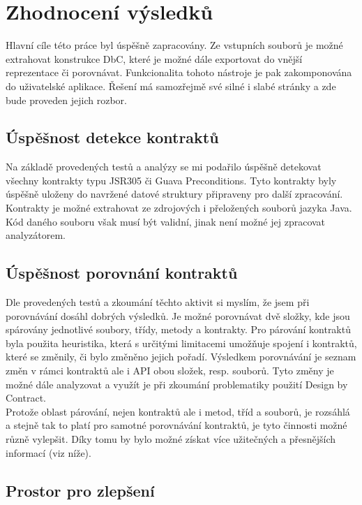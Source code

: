 \chapter{Zhodnocení výsledků}
	Hlavní cíle této práce byl úspěšně zapracovány. Ze vstupních souborů je možné extrahovat konstrukce DbC, které je možné dále exportovat do vnější reprezentace či porovnávat. Funkcionalita tohoto nástroje je pak zakomponována do uživatelské aplikace. Řešení má samozřejmě své silné i slabé stránky a zde bude proveden jejich rozbor.	
	
	
	\section{Úspěšnost detekce kontraktů}
		Na základě provedených testů a analýzy se mi podařilo úspěšně detekovat všechny kontrakty typu JSR305 či Guava Preconditions. Tyto kontrakty byly úspěšně uloženy do navržené datové struktury připraveny pro další zpracování. Kontrakty je možné extrahovat ze zdrojových i přeložených souborů jazyka Java. Kód daného souboru však musí být validní, jinak není možné jej zpracovat analyzátorem.
	
	\section{Úspěšnost porovnání kontraktů}
		Dle provedených testů a zkoumání těchto aktivit si myslím, že jsem při porovnávání dosáhl dobrých výsledků. Je možné porovnávat dvě složky, kde jsou spárovány jednotlivé soubory, třídy, metody a kontrakty. Pro párování kontraktů byla použita heuristika, která s určitými limitacemi umožňuje spojení i kontraktů, které se změnily, či bylo změněno jejich pořadí. Výsledkem porovnávání je seznam změn v rámci kontraktů ale i API obou složek, resp. souborů. Tyto změny je možné dále analyzovat a využít je při zkoumání problematiky použití Design by Contract.\\
		
		Protože oblast párování, nejen kontraktů ale i metod, tříd a souborů, je rozsáhlá a stejně tak to platí pro samotné porovnávání kontraktů, je tyto činnosti možné různě vylepšit. Díky tomu by bylo možné získat více užitečných a přesnějších informací (viz níže).
	 	
 	\section{Prostor pro zlepšení}

